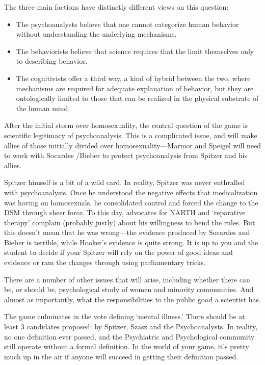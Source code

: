 \begin{refsection}
The three main factions have distinctly different views on this question: 

\begin{itemize}
\item The psychoanalysts believe that one cannot categorize human behavior without understanding the underlying mechanisms. 

\item The behaviorists believe that science requires that the limit themselves only to describing behavior. 

\item The cognitivists offer a third way, a kind of hybrid between the two, where mechanisms are required for adequate explanation of behavior, but they are ontologically limited to those that can be realized in the physical substrate of the human mind.

\end{itemize}

After the initial storm over homosexuality, the central question of the game is scientific legitimacy of psychoanalysis. This is a complicated issue, and will make allies of those initially divided over homosexuality---Marmor and Speigel will need to work with Socardes \slash  Bieber to protect psychoanalysis from Spitzer and his allies.

Spitzer himself is a bit of a wild card. In reality, Spitzer was never enthralled with psychoanalysis. Once he understood the negative effects that medicalization was having on homosexuals, he consolidated control and forced the change to the DSM through sheer force. To this day, advocates for NARTH and ‘reparative therapy’ complain (probably justly) about his willingness to bend the rules. But this doesn’t mean that he was wrong---the evidence produced by Socardes and Bieber is terrible, while Hooker’s evidence is quite strong. It is up to you and the student to decide if your Spitzer will rely on the power of good ideas and evidence or ram the changes through using parliamentary tricks.

There are a number of other issues that will arise, including whether there can be, or should be, psychological study of women and minority communities. And almost as importantly, what the responsibilities to the public good a scientist has.

The game culminates in the vote defining ‘mental illness.’ There should be at least 3 candidates proposed: by Spitzer, Szasz and the Psychoanalysts. In reality, no one definition ever passed, and the Psychiatric and Psychological community still operate without a formal definition. In the world of your game, it’s pretty much up in the air if anyone will succeed in getting their definition passed.


\end{refsection}
